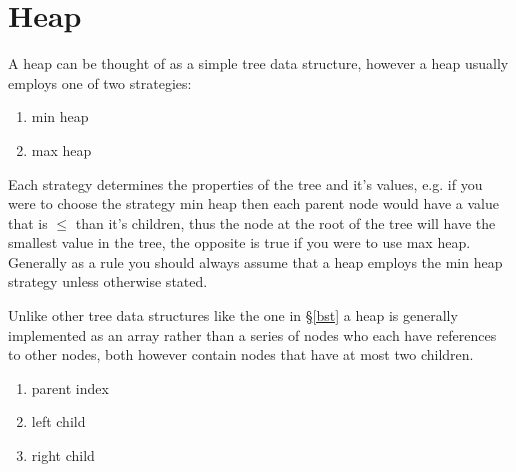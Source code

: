 \chapter{Heap}
A heap can be thought of as a simple tree data structure, however a heap usually employs one of two strategies:

\begin{enumerate}
\item min heap
\item max heap
\end{enumerate}

Each strategy determines the properties of the tree and it's values, e.g. if you were to choose the strategy min heap then each parent node would have a value that is $\leq$ than it's children, thus the node at the root of the tree will have the smallest value in the tree, the opposite is true if you were to use max heap. Generally as a rule you should always assume that a heap employs the min heap strategy unless otherwise stated.

Unlike other tree data structures like the one in \S\ref{bst} a heap is generally implemented as an array rather than a series of nodes who each have references to other nodes, both however contain nodes that have at most two children.

\begin{enumerate}
\item parent index
\item left child
\item right child
\end{enumerate}

